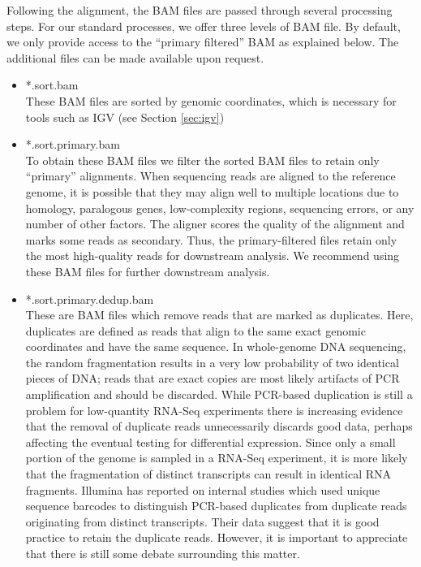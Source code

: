 \documentclass{article}
\begin{document}
{Following the alignment, the BAM files are passed through several processing steps.  For our standard processes, we offer three levels of BAM file. By default, we only provide 
access to the ``primary filtered'' BAM as explained below.  The additional files can be made available upon request.  
\begin{itemize}
\item *.sort.bam \\
These BAM files are sorted by genomic coordinates, which is necessary for tools such as IGV (see Section \ref{sec:igv})
\item *.sort.primary.bam \\
To obtain these BAM files we filter the sorted BAM files to retain only ``primary'' alignments.  When sequencing reads are aligned to the reference genome, it is possible that they may align well to multiple locations due to homology, paralogous genes, low-complexity regions, sequencing errors, or any number of other factors.  The aligner scores the quality of the alignment and marks some reads as secondary.  Thus, the primary-filtered files retain only the most high-quality reads for downstream analysis.  We recommend using these BAM files for further downstream analysis.  
\item *.sort.primary.dedup.bam \\
These are BAM files which remove reads that are marked as duplicates.  Here, duplicates are defined as reads that align to the same exact genomic coordinates and have the same sequence.  In whole-genome DNA sequencing, the random fragmentation results in a very low probability of two identical pieces of DNA; reads that are exact copies are most likely artifacts of PCR amplification and should be discarded.  While PCR-based duplication is still a problem for low-quantity RNA-Seq experiments there is increasing evidence that the removal of duplicate reads unnecessarily discards good data, perhaps affecting the eventual testing for differential expression.  Since only a small portion of the genome is sampled in a RNA-Seq experiment, it is more likely that the fragmentation of distinct transcripts can result in identical RNA fragments.  Illumina has reported on internal studies which used unique sequence barcodes to distinguish PCR-based duplicates from duplicate reads originating from distinct transcripts.  Their data suggest that it is good practice to retain the duplicate reads.  However, it is important to appreciate that there is still some debate surrounding this matter.  
\end{itemize}

}
\end{document}
